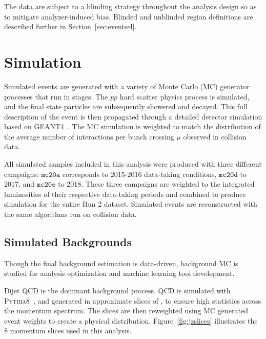The data are subject to a blinding strategy throughout the analysis design so as to mitigate analyzer-induced bias. 
Blinded and unblinded region definitions are described further in Section~\ref{sec:eventsel}.

\section{Simulation}
\label{sec:simulation}

Simulated events are generated with a variety of Monte Carlo (MC) generator processes that run in stages. The $pp$ hard scatter physics process is simulated, and the final state particles are subsequently showered and decayed. This full description of the event is then propagated through a detailed detector simulation based on GEANT4~\cite{Agostinelli:2002hh}. The MC simulation is weighted to match the distribution of the average number of interactions per bunch crossing $\mu$ observed in collision data.\par

All simulated samples included in this analysis were produced with three different campaigns: $\texttt{mc20a}$ corresponds to 2015-2016 data-taking conditions, $\texttt{mc20d}$ to 2017, and $\texttt{mc20e}$ to 2018. These three campaigns are weighted to the integrated luminosities of their respective data-taking periods and combined to produce simulation for the entire Run 2 dataset. Simulated events are reconstructed with the same algorithms run on collision data. 


\subsection{Simulated Backgrounds}
\label{subsec:bkg_mc}

Though the final background estimation is data-driven, background MC is studied for analysis optimization and machine learning tool development.\par

Dijet QCD is the dominant background process. QCD is simulated with \textsc{Pythia8}~\cite{pythia}, and generated in approximate slices of \pt, to ensure high statistics across the momentum spectrum. The slices are then reweighted using MC generated event weights to create a physical distribution. Figure~\ref{fig:jzslices} illustrates the 8 momentum slices used in this analysis.

